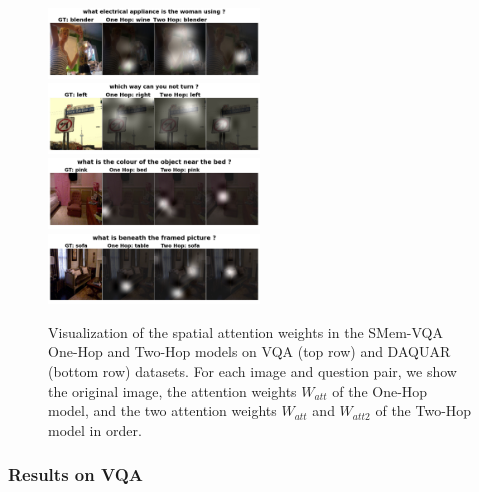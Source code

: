 \begin{figure}[t]
  \includegraphics[width=0.5\textwidth]{figures/VQA-DAQUAR_One-Hop_Two-Hop/CO_train2014_000000575060_5750602.jpg}
  \includegraphics[width=0.5\textwidth]{figures/VQA-DAQUAR_One-Hop_Two-Hop/CO_train2014_000000222383_2223830.jpg}\\
  \includegraphics[width=0.5\textwidth]{figures/VQA-DAQUAR_One-Hop_Two-Hop/image1183.png}
  \includegraphics[width=0.5\textwidth]{figures/VQA-DAQUAR_One-Hop_Two-Hop/image1444.png}
\vspace{-0.25in}
\caption{Visualization of the spatial attention weights in the SMem-VQA One-Hop and Two-Hop models on VQA (top row) and DAQUAR (bottom row) datasets. For each image and question pair, we show the original image, the attention weights $W_{att}$ of the One-Hop model, and the two attention weights $W_{att}$ and $W_{att2}$ of the Two-Hop model in order.}\label{fig:2hopVQA}
\vspace{-0.15in}
\end{figure}
\subsubsection{Results on VQA}

